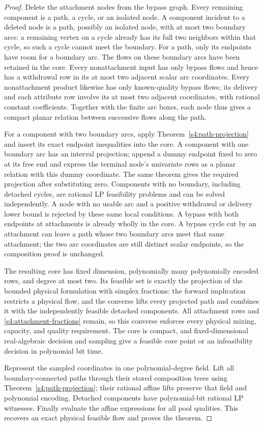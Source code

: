 \begin{proof}
Delete the attachment nodes from the bypass graph. Every remaining
component is a path, a cycle, or an isolated node. A component incident
to a deleted node is a path, possibly an isolated node, with at most
two boundary arcs: a remaining vertex on a cycle already has its full
two neighbors within that cycle, so such a cycle cannot meet the
boundary. For a path, only its endpoints have room for a boundary
arc. The flows on these boundary arcs have been retained in the core.
Every nonattachment input has only bypass flows and hence has a
withdrawal row in its at most two adjacent scalar arc coordinates.
Every nonattachment product likewise has only known-quality bypass
flows; its delivery and each attribute row involve its at most two
adjacent coordinates, with rational constant coefficients. Together
with the finite arc boxes, each node thus gives a compact planar
relation between successive flows along the path.

For a component with two boundary arcs, apply
Theorem~\ref{s4:path-projection} and insert its exact endpoint
inequalities into the core. A component with one boundary arc has
an interval projection; append a dummy endpoint fixed to zero at its
free end and express the terminal node's univariate rows as a
planar relation with this dummy coordinate. The same theorem gives
the required projection after substituting zero. Components with no
boundary, including detached cycles, are rational LP feasibility
problems and can be solved independently. A node with no usable arc
and a positive withdrawal or delivery lower bound is rejected by
these same local conditions. A bypass with both endpoints at
attachments is already wholly in the core. A bypass cycle cut by
an attachment can leave a path whose two boundary arcs meet that
same attachment; the two arc coordinates are still distinct scalar
endpoints, so the composition proof is unchanged.

The resulting core has fixed dimension, polynomially many
polynomially encoded rows, and degree at most two. Its feasible set
is exactly the projection of the bounded physical formulation with
simplex fractions: the forward implication restricts a physical
flow, and the converse lifts every projected path and combines it
with the independently feasible detached components. All attachment
rows and \eqref{s4:attachment-fractions} remain, so this converse
enforces every physical mixing, capacity, and quality requirement.
The core is compact, and fixed-dimensional real-algebraic decision
and sampling give a feasible core point or an infeasibility decision
in polynomial bit time.

Represent the sampled coordinates in one polynomial-degree field.
Lift all boundary-connected paths through their stored composition
trees using Theorem~\ref{s4:path-projection}; their rational affine
lifts preserve that field and polynomial encoding. Detached components
have polynomial-bit rational LP witnesses. Finally evaluate the affine
expressions for all pool qualities. This recovers an exact physical
feasible flow and proves the theorem.
\end{proof}

